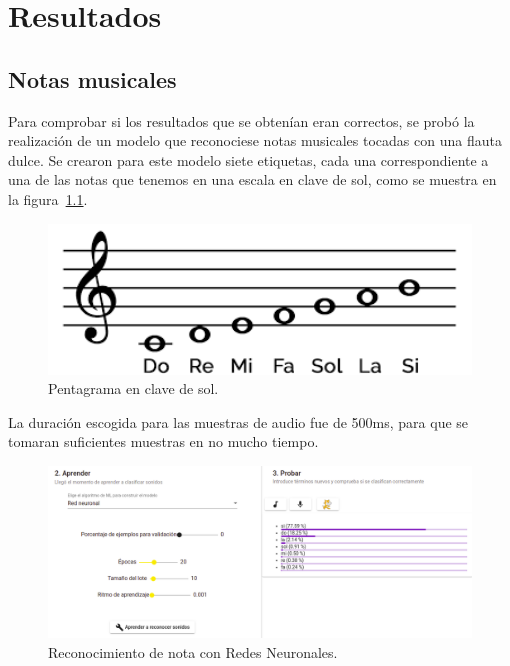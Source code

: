 \documentclass[a4paper, 12pt]{book}
\begin{document}

\cleardoublepage
\chapter{Resultados}
\label{chap:resultados}

\section{Notas musicales}
\label{sec:notas-musicales-res}

Para comprobar si los resultados que se obtenían eran correctos, se probó la realización de un modelo que reconociese notas musicales tocadas con una flauta dulce. Se crearon para este modelo siete etiquetas, cada una correspondiente a una de las notas que tenemos en una escala en clave de sol, como se muestra en la figura~\ref{fig:pentagrama}.


\begin{figure}
	\centering
	\includegraphics[width=12cm,keepaspectratio]{img/pentagrama.png}
	\caption{Pentagrama en clave de sol.}\label{fig:pentagrama}
\end{figure}

La duración escogida para las muestras de audio fue de 500ms, para que se tomaran suficientes muestras en no mucho tiempo.

\begin{figure}
	\centering
	\includegraphics[width=14cm]{img/nn1.png}
	\caption{Reconocimiento de nota con Redes Neuronales.}\label{fig:neural-networks}
\end{figure}
\end{document}
